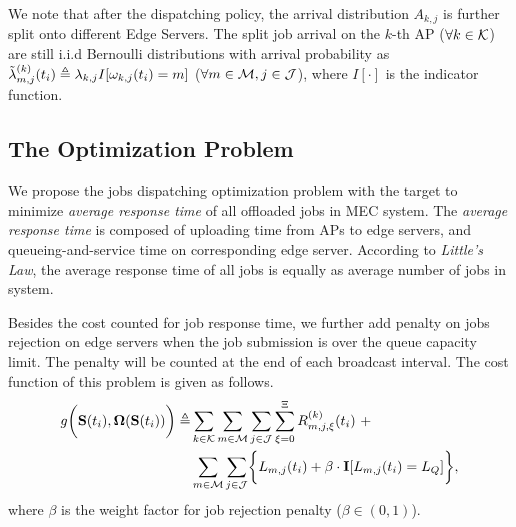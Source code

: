 We note that after the dispatching policy, the arrival distribution $A_{k,j}$ is further split onto different Edge Servers.
The split job arrival on the $k$-th AP ($\forall k\in\mathcal{K}$) are still i.i.d Bernoulli distributions with arrival probability as 
$\tilde{\lambda}^{(k)}_{m,j}(t_{i}) \triangleq \lambda_{k,j} I[\omega_{k,j}(t_i) = m]$ ($\forall m\in\mathcal{M}, j\in\mathcal{J}$), where $I[\cdot]$ is the indicator function.

\subsection{The Optimization Problem}
We propose the jobs dispatching optimization problem with the target to minimize \emph{average response time} of all offloaded jobs in MEC system.
The \emph{average response time} is composed of uploading time from APs to edge servers, and queueing-and-service time on corresponding edge server. According to \emph{Little's Law}, the average response time of all jobs is equally as average number of jobs in system.
        
Besides the cost counted for job response time, we further add penalty on jobs rejection on edge servers when the job submission is over the queue capacity limit. The penalty will be counted at the end of each broadcast interval.
The cost function of this problem is given as follows.
\begin{align}
    g\Paren{\Stat(t_{i}), \Policy(\Stat(t_{i}))} \define
        &\sum_{k\in\apSet} \sum_{m\in\esSet} \sum_{j\in\jSpace} \sum_{\xi=0}^{\Xi} R^{(k)}_{m,j,\xi}(t_{i})~+
        \nonumber\\
        &\sum_{m\in\esSet} \sum_{j\in\jSpace} \Brace{L_{m,j}(t_{i}) + \beta \cdot \mat{I}[L_{m,j}(t_{i})=L_Q]},
\end{align}
where $\beta$ is the weight factor for job rejection penalty ($\beta \in (0,1)$).
        
